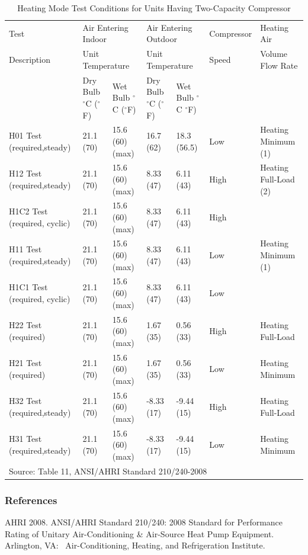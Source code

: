 \begin{longtable}[c]{p{1.2in}p{0.7in}p{0.7in}p{0.7in}p{0.7in}p{0.85in}p{1.0in}}
\caption{Heating Mode Test Conditions for Units Having Two-Capacity Compressor \label{table:heating-mode-test-conditions-for-units-having-001}} \tabularnewline
\toprule
Test & \multicolumn{2}{l}{Air Entering Indoor} & \multicolumn{2}{l}{Air Entering Outdoor} & Compressor & Heating Air \tabularnewline
Description & \multicolumn{2}{l}{Unit Temperature} & \multicolumn{2}{l}{Unit Temperature} & Speed & Volume Flow Rate \tabularnewline
\midrule
& Dry Bulb \(^{\circ}\)C (\(^{\circ}\)F) & Wet Bulb \(^{\circ}\)C (\(^{\circ}\)F) & Dry Bulb \(^{\circ}\)C (\(^{\circ}\)F) & Wet Bulb \(^{\circ}\)C \(^{\circ}\)F) \tabularnewline

H01 Test  (required,steady)  & 21.1 (70) & 15.6 (60) (max) & 16.7 (62)  & 18.3 (56.5) & Low  & Heating Minimum (1)   \tabularnewline
H12 Test  (required,steady)  & 21.1 (70) & 15.6 (60) (max) & 8.33 (47)  & 6.11 (43)   & High & Heating Full-Load (2) \tabularnewline
H1C2 Test (required, cyclic) & 21.1 (70) & 15.6 (60) (max) & 8.33 (47)  & 6.11 (43)   & High &                       \tabularnewline
H11 Test  (required,steady)  & 21.1 (70) & 15.6 (60) (max) & 8.33 (47)  & 6.11 (43)   & Low  & Heating Minimum (1)   \tabularnewline
H1C1 Test (required, cyclic) & 21.1 (70) & 15.6 (60) (max) & 8.33 (47)  & 6.11 (43)   & Low  &                       \tabularnewline
H22 Test  (required)         & 21.1 (70) & 15.6 (60) (max) & 1.67 (35)  & 0.56 (33)   & High & Heating Full-Load     \tabularnewline
H21 Test  (required)         & 21.1 (70) & 15.6 (60) (max) & 1.67 (35)  & 0.56 (33)   & Low  & Heating Minimum       \tabularnewline
H32 Test  (required,steady)  & 21.1 (70) & 15.6 (60) (max) & -8.33 (17) & -9.44 (15)  & High & Heating Full-Load     \tabularnewline
H31 Test  (required,steady)  & 21.1 (70) & 15.6 (60) (max) & -8.33 (17) & -9.44 (15)  & Low  & Heating Minimum       \tabularnewline
\midrule
\multicolumn{7}{l}{Source: Table 11, ANSI/AHRI Standard 210/240-2008}

\end{longtable}

\subsubsection{References}\label{references-6-000}

AHRI 2008. ANSI/AHRI Standard 210/240: 2008 Standard for Performance Rating of Unitary Air-Conditioning \& Air-Source Heat Pump Equipment.~ Arlington, VA:~ Air-Conditioning, Heating, and Refrigeration Institute.

